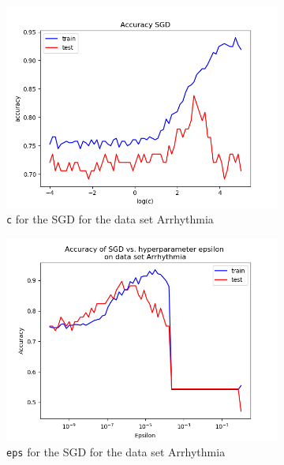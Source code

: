 \documentclass{article}
\begin{document}
\begin{figure}[H]
	\centering
	\begin{subfigure}[t]{0.45\linewidth}
		\includegraphics[width=\linewidth]{figs/hyperparams/arrythmia_sgd_c.png}
		\caption{\texttt{c} for the SGD for the data set Arrhythmia}
	\end{subfigure}
	\begin{subfigure}[t]{0.45\linewidth}
		\includegraphics[width=\linewidth]{figs/hyperparams/arrythmia_sgd_eps.png}
		\caption{\texttt{eps} for the SGD for the data set Arrhythmia}
	\end{subfigure}
	\begin{subfigure}[t]{0.45\linewidth}

\end{subfigure}
\end{figure}
\end{document}
